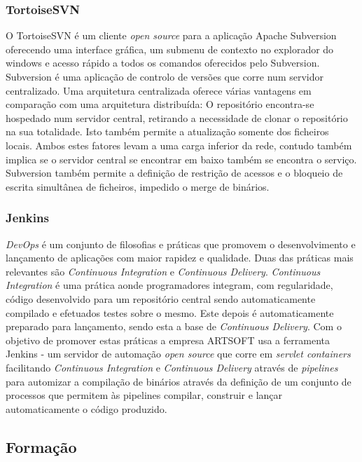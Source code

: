 \documentclass[sigplan]{acmart}
\begin{document}
\subsubsection{TortoiseSVN}

O TortoiseSVN é um cliente \textit{open source} para a aplicação Apache Subversion oferecendo uma interface gráfica, um submenu de contexto no explorador do windows e acesso rápido a todos os comandos oferecidos pelo Subversion. Subversion é uma aplicação de controlo de versões que corre num servidor centralizado. Uma arquitetura centralizada oferece várias vantagens em comparação com uma arquitetura distribuída: O repositório encontra-se hospedado num servidor central, retirando a necessidade de clonar o repositório na sua totalidade. Isto também permite a atualização somente dos ficheiros locais. Ambos estes fatores levam a uma carga inferior da rede, contudo também implica se o servidor central se encontrar em baixo também se encontra o serviço. Subversion também permite a definição de restrição de acessos e o bloqueio de escrita simultânea de ficheiros, impedido o merge de binários.

\subsubsection{Jenkins}

\textit{DevOps} é um conjunto de filosofias e práticas que promovem o desenvolvimento e lançamento de aplicações com maior rapidez e qualidade. Duas das práticas mais relevantes são \textit{Continuous Integration} e \textit{Continuous Delivery}. \textit{Continuous Integration} é uma prática aonde programadores integram, com regularidade, código desenvolvido para um repositório central sendo automaticamente compilado e efetuados testes sobre o mesmo. Este depois é automaticamente preparado para lançamento, sendo esta a base de \textit{Continuous Delivery}. Com o objetivo de promover estas práticas a empresa ARTSOFT usa a ferramenta Jenkins - um servidor de automação \textit{open source} que corre em \textit{servlet containers} facilitando \textit{Continuous Integration} e \textit{Continuous Delivery} através de \textit{pipelines} para automizar a compilação de binários através da definição de um conjunto de processos que permitem às pipelines compilar, construir e lançar automaticamente o código produzido.


\subsection{Formação}
\end{document}
